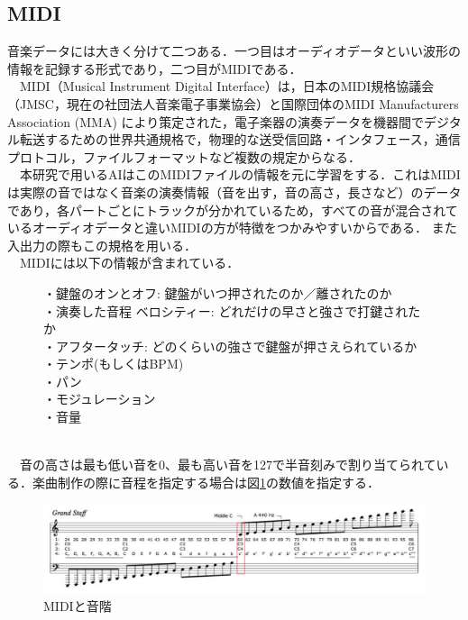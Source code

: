 \subsection{MIDI}
音楽データには大きく分けて二つある．一つ目はオーディオデータといい波形の情報を記録する形式であり，二つ目がMIDIである．\\
　MIDI（Musical Instrument Digital Interface）は，日本のMIDI規格協議会（JMSC，現在の社団法人音楽電子事業協会）と国際団体のMIDI Manufacturers Association (MMA) により策定された，電子楽器の演奏データを機器間でデジタル転送するための世界共通規格で，物理的な送受信回路・インタフェース，通信プロトコル，ファイルフォーマットなど複数の規定からなる．\\
　本研究で用いるAIはこのMIDIファイルの情報を元に学習をする．これはMIDIは実際の音ではなく音楽の演奏情報（音を出す，音の高さ，長さなど）のデータであり，各パートごとにトラックが分かれているため，すべての音が混合されているオーディオデータと違いMIDIの方が特徴をつかみやすいからである．
また入出力の際もこの規格を用いる．\\
　MIDIには以下の情報が含まれている．
\begin{figure}[!ht]
    \begin{screen}
・鍵盤のオンとオフ: 鍵盤がいつ押されたのか／離されたのか\\
・演奏した音程 ベロシティー: どれだけの早さと強さで打鍵されたか\\
・アフタータッチ: どのくらいの強さで鍵盤が押さえられているか\\
・テンポ(もしくはBPM)\\
・パン\\
・モジュレーション\\
・音量\\
    \end{screen}
\end{figure}\\
　音の高さは最も低い音を0、最も高い音を127で半音刻みで割り当てられている．楽曲制作の際に音程を指定する場合は図\ref{fig:MIDIと音階}の数値を指定する．
\begin{figure}[h]
    \begin{screen}
    \begin{center}
        \includegraphics[scale=0.45,clip]{./img/midi2.png}
        \caption{MIDIと音階}
        \label{fig:MIDIと音階}
    \end{center}
    \end{screen}
\end{figure}
\newpage
